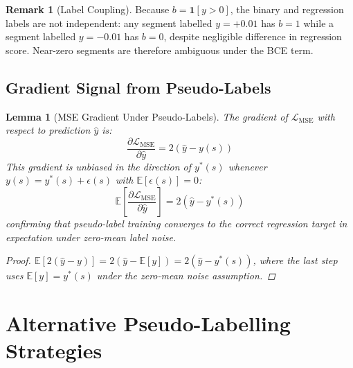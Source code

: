 \documentclass[12pt,a4paper]{article}
\theoremstyle{plain}
\newtheorem{lemma}[theorem]{Lemma}
\theoremstyle{definition}
\newtheorem{remark}[theorem]{Remark}
\begin{document}
\begin{remark}[Label Coupling]
  Because $b = \mathbf{1}[y > 0]$, the binary and regression labels
  are not independent: any segment labelled $y = +0.01$ has $b = 1$
  while a segment labelled $y = -0.01$ has $b = 0$, despite
  negligible difference in regression score.  Near-zero segments
  are therefore ambiguous under the BCE term.
\end{remark}

\subsection{Gradient Signal from Pseudo-Labels}

\begin{lemma}[MSE Gradient Under Pseudo-Labels]
\label{lem:gradient}
  The gradient of $\mathcal{L}_\text{MSE}$ with respect to
  prediction $\hat{y}$ is:
  \[
    \frac{\partial \mathcal{L}_\text{MSE}}{\partial \hat{y}} =
    2(\hat{y} - y(s))
  \]
  This gradient is unbiased in the direction of $y^*(s)$ whenever
  $y(s) = y^*(s) + \epsilon(s)$ with $\mathbb{E}[\epsilon(s)] = 0$:
  \[
    \mathbb{E}\!\left[
      \frac{\partial \mathcal{L}_\text{MSE}}{\partial \hat{y}}
    \right] =
    2(\hat{y} - y^*(s))
  \]
  confirming that pseudo-label training converges to the correct
  regression target in expectation under zero-mean label noise.
  \begin{proof}
    $\mathbb{E}[2(\hat{y} - y)] = 2(\hat{y} - \mathbb{E}[y]) =
    2(\hat{y} - y^*(s))$, where the last step uses $\mathbb{E}[y] =
    y^*(s)$ under the zero-mean noise assumption.
  \end{proof}
\end{lemma}

\section{Alternative Pseudo-Labelling Strategies}
\label{sec:alternatives}
\end{document}
